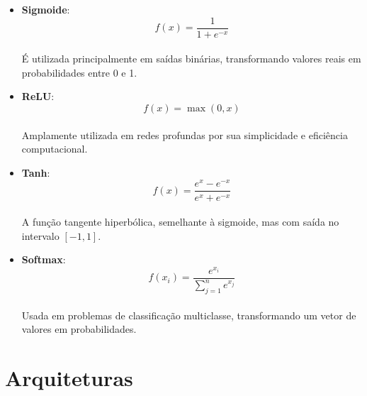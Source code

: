 \begin{itemize}
	\item \textbf{Sigmoide}:
	      \begin{equation}
		      f(x) = \frac{1}{1 + e^{-x}}
	      \end{equation}

	      \paragraph{} É utilizada principalmente em saídas binárias, transformando valores reais em probabilidades entre 0 e 1.
	\item \textbf{\ac{ReLU}}:
	      \begin{equation}
		      f(x) = \max(0, x)
	      \end{equation}

	      \paragraph{} Amplamente utilizada em redes profundas por sua simplicidade e eficiência computacional.
	\item \textbf{Tanh}:
	      \begin{equation}
		      f(x) = \frac{e^x - e^{-x}}{e^x + e^{-x}}
	      \end{equation}

	      \paragraph{} A função tangente hiperbólica, semelhante à sigmoide, mas com saída no intervalo \([-1, 1]\).

	\item \textbf{Softmax}:
	      \begin{equation}
		      f(x_i) = \frac{e^{x_i}}{\sum_{j=1}^{n} e^{x_j}}
	      \end{equation}

	      \paragraph{} Usada em problemas de classificação multiclasse, transformando um vetor de valores em probabilidades.
\end{itemize}


\section{Arquiteturas}

